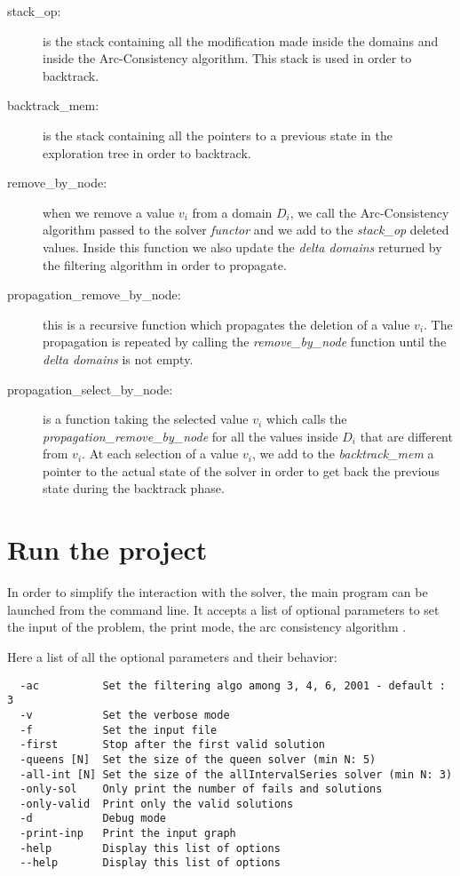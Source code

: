 \documentclass{rapport}
\begin{document}
\begin{description}
  \item[stack\_op:] is the stack containing all the modification made inside the domains and inside the Arc-Consistency algorithm. This stack is used in order to backtrack.

  \item[backtrack\_mem:] is the stack containing all the pointers to a previous state in the exploration tree in order to backtrack.

  \item[remove\_by\_node:] when we remove a value $v_i$ from a domain $D_i$, we call the Arc-Consistency algorithm passed to the solver \textit{functor} and we add to the \textit{stack\_op} deleted values. Inside this function we also update the \textit{delta domains} returned by the filtering algorithm in order to propagate.

  \item[propagation\_remove\_by\_node:] this is a recursive function which propagates the deletion of a value $v_i$. The propagation is repeated by calling the \textit{remove\_by\_node} function until the \textit{delta domains} is not empty.

  \item[propagation\_select\_by\_node:] is a function taking the selected value $v_i$ which calls the \textit{propagation\_remove\_by\_node} for all the values inside $D_i$ that are different from $v_i$. At each selection of a value $v_i$, we add to the \textit{backtrack\_mem} a pointer to the actual state of the solver in order to get back the previous state during the backtrack phase.
\end{description}

\section{Run the project}
\label{sec:arg}

In order to simplify the interaction with the solver, the main program can be launched from the command line. It accepts a list of optional parameters to set the input of the problem, the print mode, the arc consistency algorithm \etc.

Here a list of all the optional parameters and their behavior:

\begin{verbatim}
  -ac          Set the filtering algo among 3, 4, 6, 2001 - default : 3
  -v           Set the verbose mode
  -f           Set the input file
  -first       Stop after the first valid solution
  -queens [N]  Set the size of the queen solver (min N: 5)
  -all-int [N] Set the size of the allIntervalSeries solver (min N: 3)
  -only-sol    Only print the number of fails and solutions
  -only-valid  Print only the valid solutions
  -d           Debug mode
  -print-inp   Print the input graph
  -help        Display this list of options
  --help       Display this list of options
\end{verbatim}
\end{document}
